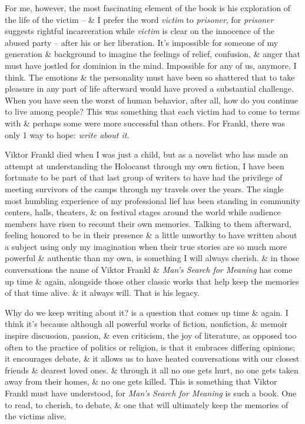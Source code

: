 \documentclass{article}
\numberwithin{equation}{section}
\begin{document}
For me, however, the most fascinating element of the book is his exploration of the life of the victim -- \& I prefer the word \textit{victim} to \textit{prisoner}, for \textit{prisoner} suggests rightful incarceration while \textit{victim} is clear on the innocence of the abused party -- after his or her liberation. It's impossible for someone of my generation \& background to imagine the feelings of relief, confusion, \& anger that must have jostled for dominion in the mind. Impossible for any of us, anymore, I think. The emotions \& the personality must have been so shattered that to take pleasure in any part of life afterward would have proved a substantial challenge. When you have seen the worst of human behavior, after all, how do you continue to live among people? This was something that each victim had to come to terms with \& perhaps some were more successful than others. For Frankl, there was only 1 way to hope: \textit{write about it}.

Viktor Frankl died when I was just a child, but as a novelist who has made an attempt at understanding the Holocaust through my own fiction, I have been fortunate to be part of that last group of writers to have had the privilege of meeting survivors of the camps through my travels over the years. The single most humbling experience of my professional lief has been standing in community centers, halls, theaters, \& on festival stages around the world while audience members have risen to recount their own memories. Talking to them afterward, feeling honored to be in their presence \& a little unworthy to have written about a subject using only my imagination when their true stories are so much more powerful \& authentic than my own, is something I will always cherish. \& in those conversations the name of Viktor Frankl \& \textit{Man's Search for Meaning} has come up time \& again, alongside those other classic works that help keep the memories of that time alive. \& it always will. That is his legacy.

Why do we keep writing about it? is a question that comes up time \& again. I think it's because although all powerful works of fiction, nonfiction, \& memoir inspire discussion, passion, \& even criticism, the joy of literature, as opposed too often to the practice of politics or religion, is that it embraces differing opinions; it encourages debate, \& it allows us to have heated conversations with our closest friends \& dearest loved ones. \& through it all no one gets hurt, no one gets taken away from their homes, \& no one gets killed. This is something that Viktor Frankl must have understood, for \textit{Man's Search for Meaning} is such a book. One to read, to cherish, to debate, \& one that will ultimately keep the memories of the victims alive.
\end{document}
